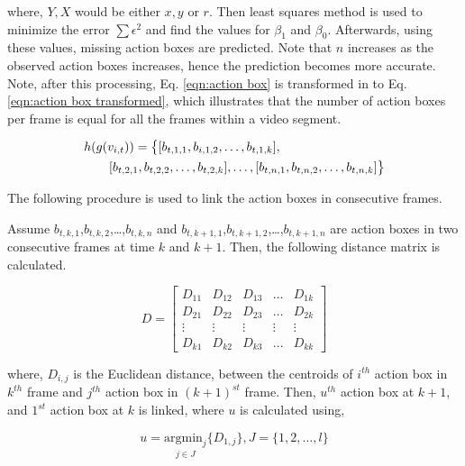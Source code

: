 where, $Y, X$ would be either $x,y$ or $r$. Then least squares method is used to minimize the error $\sum{\epsilon^2}$ and find the
values for $\beta_{1}$ and $\beta_{0}$. Afterwards, using these values, missing action boxes are predicted.
Note that $n$ increases as the observed action boxes
increases, hence the prediction becomes more accurate. Note, after this processing, Eq. \ref{eqn:action box}
is transformed in to Eq. \ref{eqn:action box transformed},
which illustrates that the number of action boxes per frame is equal for all the frames within a video segment.

\begin{equation}
\label{eqn:action box transformed}
\begin{split}
\MoveEqLeft
 h(g(v_{i,t})) = \big\{[b_{t,1,1},b_{i,1,2},\dots,b_{t,1,k}],\\
 & [b_{t,2,1},b_{t,2,2},\dots,b_{t,2,k}],\dots,[b_{t,n,1},b_{t,n,2},\dots,b_{t,n,k}]\big\}
\end{split}
\end{equation}


The following procedure
is used to link the action boxes in consecutive frames.

Assume $b_{t,k,1}$,$b_{t,k,2}$,\dots,$b_{t,k,n}$ and $b_{t,k+1,1}$,$b_{t,k+1,2}$,\dots,$b_{t,k+1,n}$  are action boxes in two
consecutive frames at time $k$ and $k+1$. Then, the following distance matrix is calculated.



\begin{equation}
D=\begin{bmatrix}
    D_{11}       & D_{12} & D_{13} & \dots & D_{1k} \\
    D_{21}       & D_{22} & D_{23} & \dots & D_{2k} \\
    \vdots       & \vdots & \vdots & \vdots & \vdots \\
    D_{k1}       & D_{k2} & D_{k3} & \dots & D_{kk}
\end{bmatrix}
\end{equation}


where, $D_{i,j}$ is the Euclidean distance, between the centroids of $i^{th}$ action box in $k^{th}$ frame and $j^{th}$ action box in $(k+1)^{st}$ frame.
Then, $u^{th}$ action box at $k+1$, and $1^{st}$ action box at $k$ is linked, where $u$ is calculated using,


\begin{equation}
u=\underset{j\in J}{\mathrm{argmin}_j}\{D_{1,j}\}, J=\{1,2,\dots,l\}
\label{link eq}
\end{equation}

